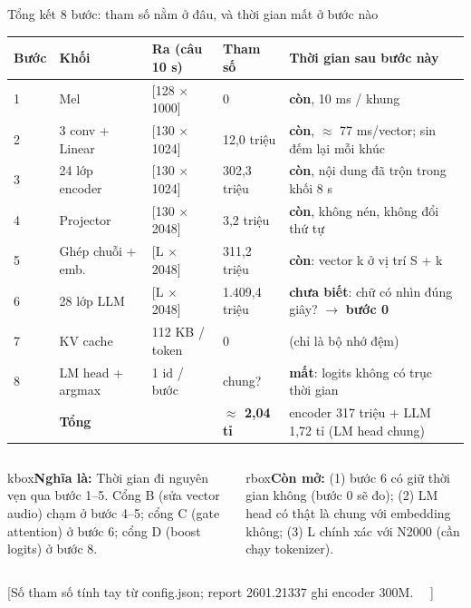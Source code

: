 \documentclass[aspectratio=169,xcolor=table]{beamer}
\newcommand{\hi}[1]{\textcolor{Primary}{\textbf{#1}}}
\newcommand{\bad}[1]{\textcolor{RiskRed}{\textbf{#1}}}
\newcommand{\good}[1]{\textcolor{GoodGreen}{\textbf{#1}}}
\newcommand{\src}[1]{\par\vfill{\tiny\color{TextGray}[#1]}}
\newcommand{\ra}{$\rightarrow$}
\newcommand{\bsz}{\footnotesize}%
\newcommand{\nghiala}[1]{\begin{beamercolorbox}[sep=0.32em,rounded=true]{kbox}\bsz\textbf{Nghĩa là:} #1\end{beamercolorbox}}
\newcommand{\yeu}[1]{\begin{beamercolorbox}[sep=0.40em,rounded=true]{rbox}\bsz #1\end{beamercolorbox}}
\newcommand{\tagbox}[2]{{\scriptsize\colorbox{#1}{\textcolor{white}{\textbf{#2}}}}}
\newcommand{\TA}{\tagbox{TextGray}{ta}}
\begin{document}
\begin{frame}{Tổng kết 8 bước: tham số nằm ở đâu, và thời gian mất ở bước nào}
\renewcommand{\bsz}{\scriptsize}
\renewcommand{\arraystretch}{1.0}\scriptsize\setlength{\tabcolsep}{3.5pt}
\begin{tabular}{C{0.6cm}L{2.7cm}L{2.0cm}R{1.75cm}L{5.75cm}}
\toprule
Bước & Khối & Ra (câu 10 s) & Tham số & Thời gian sau bước này \\
 & Mel & [128 $\times$ 1000] & 0 & \good{còn}, 10 ms / khung \\
2 & 3 conv + Linear & [130 $\times$ 1024] & 12,0 triệu & \good{còn}, $\approx$ 77 ms/vector; sin đếm lại mỗi khúc \\
3 & 24 lớp encoder & [130 $\times$ 1024] & 302,3 triệu & \good{còn}, nội dung đã trộn trong khối 8 s \\
4 & Projector & [130 $\times$ 2048] & 3,2 triệu & \good{còn}, không nén, không đổi thứ tự \\
5 & Ghép chuỗi + emb. & [L $\times$ 2048] & 311,2 triệu & \good{còn}: vector k ở vị trí S + k \\
6 & 28 lớp LLM & [L $\times$ 2048] & 1.409,4 triệu & \textbf{chưa biết}: chữ có nhìn đúng giây? \ra{} \hi{bước 0} \\
7 & KV cache & 112 KB / token & 0 & (chỉ là bộ nhớ đệm) \\
8 & LM head + argmax & 1 id / bước & chung? & \bad{mất}: logits không có trục thời gian \\
\midrule
 & \textbf{Tổng} & & \textbf{$\approx$ 2,04 tỉ} & encoder 317 triệu + LLM 1,72 tỉ (LM head chung) \\
\bottomrule
\end{tabular}
\vspace{0.08cm}

\begin{columns}[T]
\nghiala{Thời gian đi nguyên vẹn qua bước 1--5. Cổng B (sửa vector audio) chạm ở bước 4--5; cổng C (gate attention) ở bước 6; cổng D (boost logits) ở bước 8.}
\yeu{\textbf{Còn mở:} (1) bước 6 có giữ thời gian không (bước 0 sẽ đo); (2) LM head có thật là chung với embedding không; (3) L chính xác với N2000 (cần chạy tokenizer).}
\end{columns}
\src{Số tham số tính tay từ config.json; report 2601.21337 ghi encoder 300M. \TA}
\end{frame}
\end{document}
